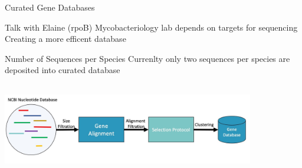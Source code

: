 \documentclass[11pt, xcolor=table]{beamer}
\begin{document}
  \begin{frame}{Curated Gene Databases}
  
  Talk with Elaine (rpoB)
  Mycobacteriology lab depends on targets for sequencing
  Creating a more efficent database
  \begin{block}{Number of Sequences per Species}
  Currenlty only two sequences per species are deposited into curated database
  \end{block}
  \center
  \includegraphics[height=4cm, width=11cm]{CPBS_11_18/Gene_Database_Workflow.jpg}
  \end{frame}
\end{document}
